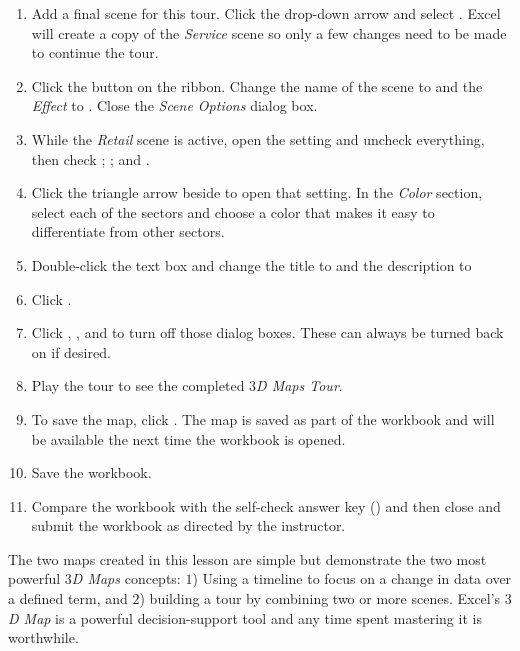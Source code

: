 \begin{enumbox}
\begin{enumerate}
		\item Add a final scene for this tour. Click the  drop-down arrow and select . Excel will create a copy of the \textit{Service} scene so only a few changes need to be made to continue the tour.
		\item Click the  button on the ribbon. Change the name of the scene to  and the \textit{Effect} to . Close the \textit{Scene Options} dialog box.
		\item While the \textit{Retail} scene is active, open the  setting and uncheck everything, then check ; ; and .
		\item Click the triangle arrow beside  to open that setting. In the \textit{Color} section, select each of the sectors and choose a color that makes it easy to differentiate from other sectors.
		\item Double-click the text box and change the title to  and the description to 
		\item Click .
		
		\item Click , , and  to turn off those dialog boxes. These can always be turned back on if desired.
		\item Play the tour to see the completed \textit{$ 3 $D Maps Tour}.
		\item To save the map, click . The map is saved as part of the workbook and will be available the next time the workbook is opened.
	
		\item Save the  workbook.
		\item Compare the workbook with the self-check answer key () and then close and submit the  workbook as directed by the instructor.
		
	\end{enumerate}
\end{enumbox}

The two maps created in this lesson are simple but demonstrate the two most powerful \textit{$ 3 $D Maps} concepts: $ 1 $) Using a timeline to focus on a change in data over a defined term, and $ 2 $) building a tour by combining two or more scenes. Excel's \textit{$ 3 $D Map} is a powerful decision-support tool and any time spent mastering it is worthwhile.

